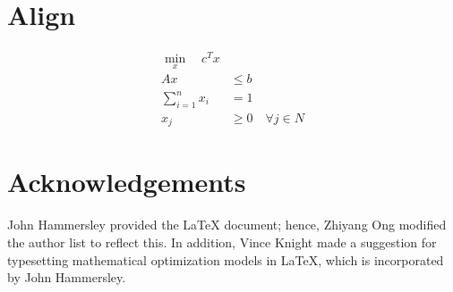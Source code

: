 \documentclass[a4paper]{article}
\begin{document}
\section{Align} %

\begin{align*}
\min_x \quad c^T x \\
Ax &\leq b \\
\sum_{i=1}^n x_i &= 1\\
x_j &\geq 0 \quad \forall j \in N
\end{align*}







\section*{Acknowledgements}
\label{sec:Acknowledgements}


John Hammersley provided the LaTeX document; hence, Zhiyang Ong modified the author list to reflect this. In addition, Vince Knight made a suggestion for typesetting mathematical optimization models in \LaTeX, which is incorporated by John Hammersley.
\end{document}
